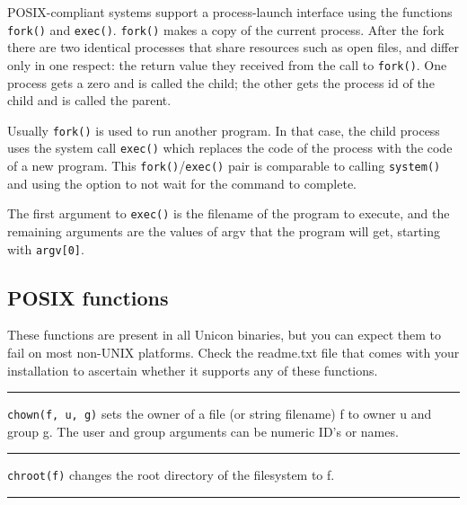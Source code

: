 POSIX-compliant systems support a process-launch interface
using the functions \texttt{fork()} and \texttt{exec()}.
\texttt{fork()} makes a copy of the current
process. After the fork there are two identical processes that
share resources such as open files, and differ only in one respect:
the return value they received from the call to \texttt{fork()}. One
process gets a zero and is called the child; the other gets the
process id of the child and is called the parent.

Usually \texttt{fork()} is used to run another program. In that
case, the child process uses the system call \texttt{exec()} which
replaces the code of the process with the code of a new program. This
\texttt{fork()}/\texttt{exec()} pair is comparable to calling
\texttt{system()} and using the option to not wait for the command to
complete.

The first argument to \texttt{exec()} is the filename of the program
to execute, and the remaining arguments are the values of argv that
the program will get, starting with \texttt{argv[0]}.


\subsection*{POSIX functions}

These functions are present in all Unicon binaries, but you can expect them to
fail on most non-UNIX platforms. Check the readme.txt file that comes with
your installation to ascertain whether it supports any of these functions.

\bigskip\hrule\vspace{0.1cm}

\noindent
\texttt{chown(f, u, g)} sets the owner of a file (or string filename) f to
owner u and group g. The user and group arguments can be numeric
ID's or names.

\bigskip\hrule\vspace{0.1cm}

\noindent
\texttt{chroot(f)} changes the root directory of the filesystem to f.

\bigskip\hrule\vspace{0.1cm}

